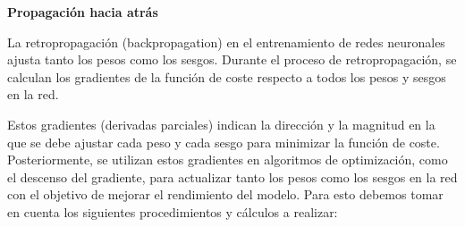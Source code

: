 \textbf{Propagación hacia atrás}

La retropropagación (backpropagation) en el entrenamiento de redes neuronales ajusta tanto los pesos como los sesgos. Durante el proceso de retropropagación, se calculan los gradientes de la función de coste respecto a todos los pesos y sesgos en la red.

Estos gradientes (derivadas parciales) indican la dirección y la magnitud en la que se debe ajustar cada peso y cada sesgo para minimizar la función de coste. Posteriormente, se utilizan estos gradientes en algoritmos de optimización, como el descenso del gradiente, para actualizar tanto los pesos como los sesgos en la red con el objetivo de mejorar el rendimiento del modelo. Para esto debemos tomar en cuenta los siguientes procedimientos y cálculos a realizar:

